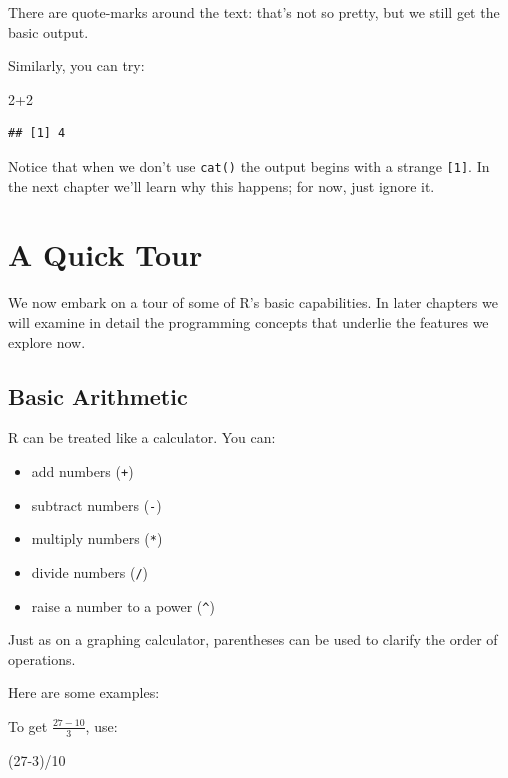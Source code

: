 \documentclass[]{book}
\makeatletter
\newenvironment{Shaded}{\begin{snugshade}}{\end{snugshade}}
\newcommand{\DecValTok}[1]{\textcolor[rgb]{0.00,0.00,0.81}{{#1}}}
\newcommand{\NormalTok}[1]{{#1}}
\providecommand{\tightlist}{%
  \setlength{\itemsep}{0pt}\setlength{\parskip}{0pt}}
\newenvironment{kframe}{%
\medskip{}
\setlength{\fboxsep}{.8em}
 \def\at@end@of@kframe{}%
 \ifinner\ifhmode%
  \def\at@end@of@kframe{\end{minipage}}%
  \begin{minipage}{\columnwidth}%
 \fi\fi%
 \def\FrameCommand##1{\hskip\@totalleftmargin \hskip-\fboxsep
 \colorbox{shadecolor}{##1}\hskip-\fboxsep
     \hskip-\linewidth \hskip-\@totalleftmargin \hskip\columnwidth}%
 \MakeFramed {\advance\hsize-\width
   \@totalleftmargin\z@ \linewidth\hsize
   \@setminipage}}%
 {\par\unskip\endMakeFramed%
 \at@end@of@kframe}
\renewenvironment{Shaded}{\begin{kframe}}{\end{kframe}}
\theoremstyle{definition}
\theoremstyle{definition}
\theoremstyle{remark}
\makeatother
\begin{document}
There are quote-marks around the text: that's not so pretty, but we
still get the basic output.

Similarly, you can try:

\begin{Shaded}
\begin{Highlighting}[]
\DecValTok{2+2}
\end{Highlighting}
\end{Shaded}

\begin{verbatim}
## [1] 4
\end{verbatim}

Notice that when we don't use \texttt{cat()} the output begins with a
strange \texttt{{[}1{]}}. In the next chapter we'll learn why this
happens; for now, just ignore it.

\section{A Quick Tour}\label{idea-tour}

We now embark on a tour of some of R's basic capabilities. In later
chapters we will examine in detail the programming concepts that
underlie the features we explore now.

\subsection{Basic Arithmetic}\label{idea-arithmetic}

R can be treated like a calculator. You can:

\begin{itemize}
\tightlist
\item
  add numbers (\texttt{+})
\item
  subtract numbers (\texttt{-})
\item
  multiply numbers (\texttt{*})
\item
  divide numbers (\texttt{/})
\item
  raise a number to a power (\texttt{\^{}})
\end{itemize}

Just as on a graphing calculator, parentheses can be used to clarify the
order of operations.

Here are some examples:

To get \(\frac{27-10}{3}\), use:

\begin{Shaded}
\begin{Highlighting}[]
\NormalTok{(}\DecValTok{27-3}\NormalTok{)/}\DecValTok{10}
\end{Highlighting}
\end{Shaded}
\end{document}
